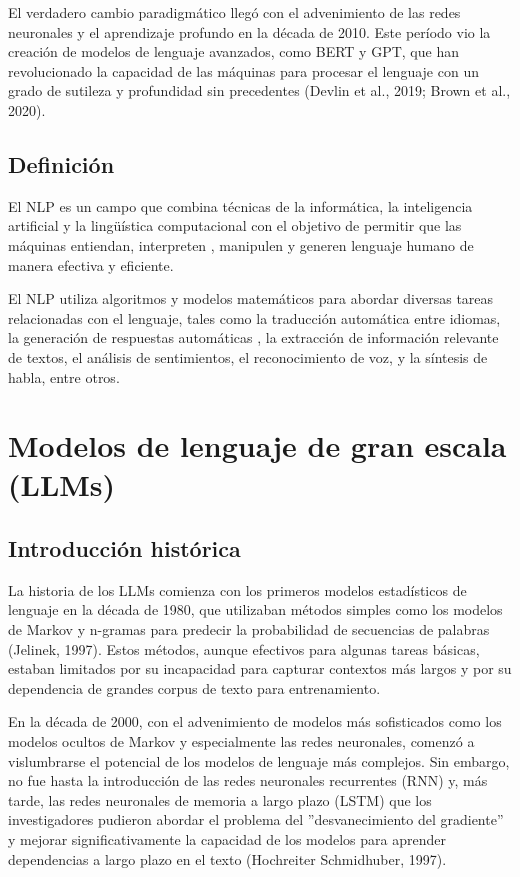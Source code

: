 El verdadero cambio paradigmático llegó con el advenimiento de las redes neuronales y el aprendizaje profundo
en la década de 2010.
Este período vio la creación de modelos de lenguaje avanzados, como BERT y GPT, que han revolucionado la capacidad de
las máquinas para procesar el lenguaje con un grado de sutileza y profundidad sin precedentes (Devlin et al., 2019;
Brown et al., 2020).

\subsection{Definición}
El NLP es un campo que combina técnicas de la informática, la inteligencia artificial y la lingüística computacional con
el objetivo de permitir que las máquinas entiendan, interpreten
, manipulen y generen lenguaje humano de manera efectiva y eficiente.

El NLP utiliza algoritmos y modelos matemáticos para abordar diversas tareas relacionadas con el lenguaje, tales como la
traducción automática entre idiomas, la generación de respuestas automáticas
, la extracción de información relevante de textos, el análisis de sentimientos, el reconocimiento de voz, y
la síntesis de habla, entre otros.


\section{Modelos de lenguaje de gran escala (LLMs)}

\subsection{Introducción histórica}
La historia de los LLMs comienza con los primeros modelos estadísticos de lenguaje en
la década de 1980, que utilizaban métodos simples como los modelos de Markov y n-gramas para predecir la probabilidad
de secuencias de palabras (Jelinek, 1997).
Estos métodos, aunque efectivos para algunas tareas básicas, estaban limitados por su incapacidad para capturar contextos
más largos y por su dependencia de grandes corpus de texto para entrenamiento.

En la década de 2000, con el advenimiento de modelos más sofisticados como los modelos ocultos de Markov
y especialmente las redes neuronales, comenzó a vislumbrarse el
potencial de los modelos de lenguaje más complejos.
Sin embargo, no fue hasta la introducción de las redes neuronales recurrentes (RNN) y, más tarde, las redes neuronales
de memoria a largo plazo (LSTM)
que los investigadores pudieron abordar el problema del ''desvanecimiento del gradiente''
y mejorar significativamente la capacidad de los
modelos para aprender dependencias a largo plazo en el texto (Hochreiter Schmidhuber, 1997).

